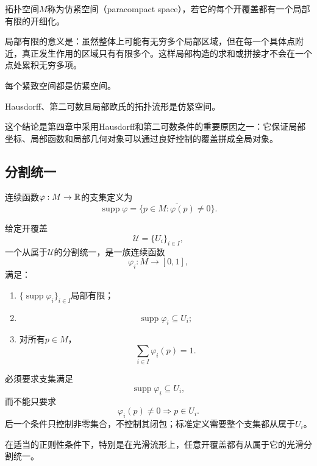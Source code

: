 \begin{definition}[仿紧空间]
拓扑空间$M$称为仿紧空间（paracompact space），若它的每个开覆盖都有一个局部有限的开细化。
\end{definition}

局部有限的意义是：虽然整体上可能有无穷多个局部区域，但在每一个具体点附近，真正发生作用的区域只有有限多个。这样局部构造的求和或拼接才不会在一个点处累积无穷多项。

\begin{theorem}[紧空间仿紧]
每个紧致空间都是仿紧空间。
\end{theorem}

\begin{theorem}[流形的仿紧性]
Hausdorff、第二可数且局部欧氏的拓扑流形是仿紧空间。
\end{theorem}

这个结论是第四章中采用Hausdorff和第二可数条件的重要原因之一：它保证局部坐标、局部函数和局部几何对象可以通过良好控制的覆盖拼成全局对象。

\subsection{分割统一}

\begin{definition}[支集]
连续函数$\varphi:M\to\mathbb{R}$的支集定义为
\[
    \operatorname{supp}\varphi
    =
    \overline{\{p\in M:\varphi(p)\neq0\}}.
\]
\end{definition}

\begin{definition}[分割统一]
给定开覆盖
\[
    \mathcal U=\{U_i\}_{i\in I},
\]
一个从属于$\mathcal U$的分割统一，是一族连续函数
\[
    \varphi_i:M\to[0,1],
\]
满足：
\begin{enumerate}
    \item $\{\operatorname{supp}\varphi_i\}_{i\in I}$局部有限；
    \item
    \[
        \operatorname{supp}\varphi_i\subseteq U_i;
    \]
    \item 对所有$p\in M$，
    \[
        \sum_{i\in I}\varphi_i(p)=1.
    \]
\end{enumerate}
\end{definition}

必须要求支集满足
\[
    \operatorname{supp}\varphi_i\subseteq U_i,
\]
而不能只要求
\[
    \varphi_i(p)\neq0\Longrightarrow p\in U_i.
\]
后一个条件只控制非零集合，不控制其闭包；标准定义需要整个支集都从属于$U_i$。

\begin{theorem}[分割统一的存在性]
在适当的正则性条件下，特别是在光滑流形上，任意开覆盖都有从属于它的光滑分割统一。
\end{theorem}

